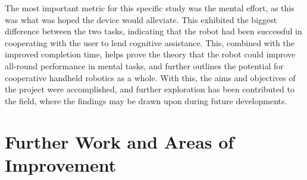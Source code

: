 \documentclass[11pt]{article}
\begin{document}
The most important metric for this specific study was the mental effort, as this was what was hoped the device would alleviate. This exhibited the biggest difference between the two tasks, indicating that the robot had been successful in cooperating with the user to lend cognitive assistance. This, combined with the improved completion time, helps prove the theory that the robot could improve all-round performance in mental tasks, and further outlines the potential for cooperative handheld robotics as a whole. With this, the aims and objectives of the project were accomplished, and further exploration has been contributed to the field, where the findings may be drawn upon during future developments. 




 

\pagebreak
\section{Further Work and Areas of Improvement}

\pagebreak



\pagebreak
\pagestyle{empty}
\end{document}
